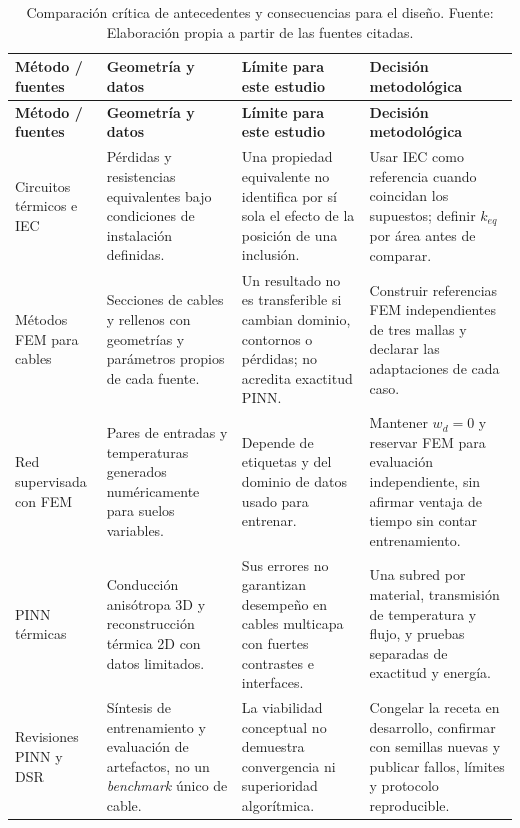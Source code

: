 \begingroup\footnotesize\setlength{\tabcolsep}{3pt}
\begin{longtable}{L{2.4cm}L{3.4cm}L{3.8cm}L{3.9cm}}
\caption{Comparación crítica de antecedentes y consecuencias para el diseño. Fuente: Elaboración propia a partir de las fuentes citadas.}
\label{tab:antecedentes-comparativos}\\
\toprule
\textbf{Método / fuentes} & \textbf{Geometría y datos} & \textbf{Límite para este estudio} & \textbf{Decisión metodológica} \\
\midrule\endfirsthead
\toprule
\textbf{Método / fuentes} & \textbf{Geometría y datos} & \textbf{Límite para este estudio} & \textbf{Decisión metodológica} \\
\midrule\endhead
\bottomrule\endfoot
Circuitos térmicos e IEC \parencites{neher1957}{iec60287} & Pérdidas y resistencias equivalentes bajo condiciones de instalación definidas. & Una propiedad equivalente no identifica por sí sola el efecto de la posición de una inclusión. & Usar IEC como referencia cuando coincidan los supuestos; definir $k_{eq}$ por área antes de comparar. \\
Métodos FEM para cables \parencites{aras2005}{oclon2015}{kim2025} & Secciones de cables y rellenos con geometrías y parámetros propios de cada fuente. & Un resultado no es transferible si cambian dominio, contornos o pérdidas; no acredita exactitud PINN. & Construir referencias FEM independientes de tres mallas y declarar las adaptaciones de cada caso. \\
Red supervisada con FEM \parencite{aldulaimi2024} & Pares de entradas y temperaturas generados numéricamente para suelos variables. & Depende de etiquetas y del dominio de datos usado para entrenar. & Mantener $w_d=0$ y reservar FEM para evaluación independiente, sin afirmar ventaja de tiempo sin contar entrenamiento. \\
PINN térmicas \parencites{xing2023}{pan2025} & Conducción anisótropa 3D y reconstrucción térmica 2D con datos limitados. & Sus errores no garantizan desempeño en cables multicapa con fuertes contrastes e interfaces. & Una subred por material, transmisión de temperatura y flujo, y pruebas separadas de exactitud y energía. \\
Revisiones PINN y DSR \parencites{lawal2022}{ren2025}{gregor2013} & Síntesis de entrenamiento y evaluación de artefactos, no un \textit{benchmark} único de cable. & La viabilidad conceptual no demuestra convergencia ni superioridad algorítmica. & Congelar la receta en desarrollo, confirmar con semillas nuevas y publicar fallos, límites y protocolo reproducible. \\
\end{longtable}\endgroup

